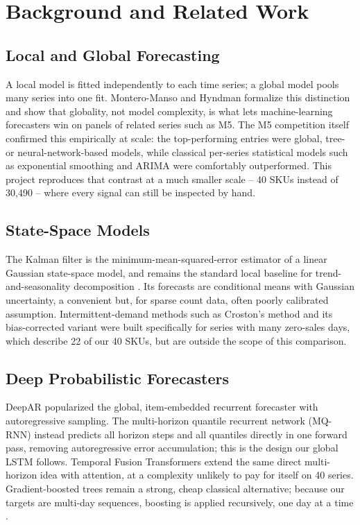 \documentclass[conference]{IEEEtran}
\begin{document}
\section{Background and Related Work}
\label{sec:background}

\subsection{Local and Global Forecasting}
A local model is fitted independently to each time series; a global model pools many series into
one fit. Montero-Manso and Hyndman \cite{montero2021} formalize this distinction and show that globality, not model
complexity, is what lets machine-learning forecasters win on panels of related series such as M5.
The M5 competition itself \cite{makridakis2022} confirmed this empirically at scale: the
top-performing entries were global, tree- or neural-network-based models, while classical per-series
statistical models such as exponential smoothing and ARIMA were comfortably outperformed. This
project reproduces that contrast at a much smaller scale -- 40 SKUs instead of 30{,}490 -- where
every signal can still be inspected by hand.

\subsection{State-Space Models}
The Kalman filter \cite{kalman1960} is the minimum-mean-squared-error estimator of a linear
Gaussian state-space model, and remains the standard local baseline for trend-and-seasonality
decomposition \cite{durbin2012}. Its forecasts are conditional means with Gaussian uncertainty, a
convenient but, for sparse count data, often poorly calibrated assumption. Intermittent-demand
methods such as Croston's method \cite{croston1972} and its bias-corrected variant
\cite{syntetos2005} were built specifically for series with many zero-sales days, which describe
22 of our 40 SKUs, but are outside the scope of this comparison.

\subsection{Deep Probabilistic Forecasters}
DeepAR \cite{salinas2020} popularized the global, item-embedded recurrent forecaster with
autoregressive sampling. The multi-horizon quantile recurrent network (MQ-RNN) \cite{wen2017}
instead predicts all horizon steps and all quantiles directly in one forward pass, removing
autoregressive error accumulation; this is the design our global LSTM follows. Temporal Fusion
Transformers \cite{lim2021} extend the same direct multi-horizon idea with attention, at a
complexity unlikely to pay for itself on 40 series. Gradient-boosted trees \cite{friedman2001}
remain a strong, cheap classical alternative; because our targets are multi-day sequences, boosting
is applied recursively, one day at a time \cite{taieb2012}.
\end{document}
